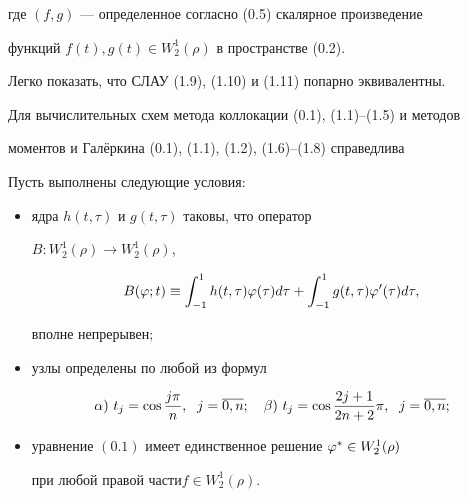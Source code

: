где $(f,g)$  --- определенное согласно (0.5) скалярное произведение 


функций $f(t), g(t)\in W_2^1(\rho)$ в пространстве (0.2).





Легко показать, что СЛАУ (1.9), (1.10) и (1.11) попарно эквивалентны.





Для вычислительных схем метода коллокации (0.1), (1.1)--(1.5) и методов 


моментов и Гал\"еркина (0.1), (1.1), (1.2), (1.6)--(1.8) справедлива





\begin{thm}


Пусть выполнены следующие условия\/${:}$


\begin{itemize}


\item[а)]


ядра $h(t,\tau)$ и $g(t,\tau)$ таковы, что оператор


$B:W_2^1(\rho)\to W_2^1(\rho)$, 


\begin{equation}


B(\vp;t)\equiv \int_{-1}^{1}h(t,\tau)\vp(\tau)d\tau +


\int_{-1}^{1}g(t,\tau)\vp'(\tau)d\tau,


\end{equation}


вполне непрерывен$;$


\item[б)] узлы определены по любой из формул


\begin{equation}


\alpha)\ t_j = \cos \frac{j\pi}{n},\ \; j=\ol{0,n};\quad


\beta)\ t_j = \cos \frac{2j+1}{2n+2}\pi,\ \; j=\ol{0,n};


\end{equation}


\item[в)] уравнение $(0.1)$ имеет единственное решение $\varphi^*\in W_2^1(\rho)$ 


при любой правой части\linebreak $f\in W_2^1(\rho)$.


\end{itemize}






\end{thm}
